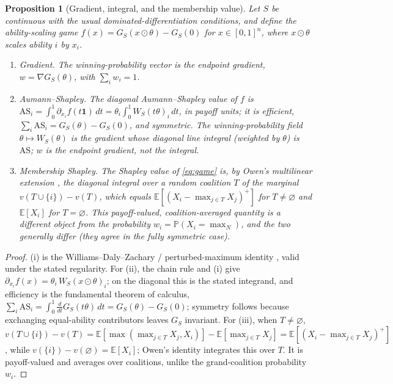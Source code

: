 \documentclass[11pt]{article}
\newcommand{\E}{\mathbb{E}}
\newcommand{\Prob}{\mathbb{P}}
\newtheorem{proposition}{Proposition}
\begin{document}
\begin{proposition}[Gradient, integral, and the membership value]
\label{prop:bridge}
Let $S$ be continuous with the usual dominated-differentiation conditions, and define
the ability-scaling game $f(x) = G_S(x\odot\theta) - G_S(0)$ for $x\in[0,1]^n$, where
$x\odot\theta$ scales ability $i$ by $x_i$.
\begin{enumerate}
\item[\textup{(i)}] \emph{Gradient.} The winning-probability vector is the endpoint
  gradient, $w = \nabla G_S(\theta)$, with $\sum_i w_i = 1$.
\item[\textup{(ii)}] \emph{Aumann--Shapley.} The diagonal Aumann--Shapley value of
  $f$ \parencite{aumannshapley1974} is
  $\mathrm{AS}_i = \int_0^1 \partial_{x_i} f(t\mathbf 1)\,dt
   = \theta_i \int_0^1 W_S(t\theta)_i\,dt$, in payoff units; it is efficient,
  $\sum_i \mathrm{AS}_i = G_S(\theta) - G_S(0)$, and symmetric. The
  winning-probability field $\theta\mapsto W_S(\theta)$ is the \emph{gradient} whose
  diagonal line integral (weighted by $\theta$) is $\mathrm{AS}$; $w$ is the endpoint
  gradient, not the integral.
\item[\textup{(iii)}] \emph{Membership Shapley.} The Shapley value of \eqref{eq:game}
  is, by Owen's multilinear extension \parencite{owen1972}, the diagonal integral
  over a random coalition $T$ of the marginal $v(T\cup\{i\}) - v(T)$, which equals
  $\E[(X_i - \max_{j\in T} X_j)^+]$ for $T\neq\varnothing$ and $\E[X_i]$ for
  $T = \varnothing$. This payoff-valued, coalition-averaged quantity is a different
  object from the probability $w_i = \Prob(X_i = \max_N)$, and the two generally
  differ (they agree in the fully symmetric case).
\end{enumerate}
\end{proposition}
\begin{proof}
(i) is the Williams--Daly--Zachary / perturbed-maximum identity
\parencite{williams1977, berthet2020}, valid under the stated regularity. For (ii),
the chain rule and (i) give $\partial_{x_i} f(x) = \theta_i\, W_S(x\odot\theta)_i$;
on the diagonal this is the stated integrand, and efficiency is the fundamental
theorem of calculus,
$\sum_i \mathrm{AS}_i = \int_0^1 \tfrac{d}{dt} G_S(t\theta)\,dt = G_S(\theta)-G_S(0)$;
symmetry follows because exchanging equal-ability contributors leaves $G_S$
invariant. For (iii), when $T\neq\varnothing$,
$v(T\cup\{i\}) - v(T) = \E[\max(\max_{j\in T} X_j, X_i)] - \E[\max_{j\in T} X_j]
= \E[(X_i - \max_{j\in T} X_j)^+]$, while $v(\{i\}) - v(\varnothing) = \E[X_i]$;
Owen's identity integrates this over $T$. It is payoff-valued and averages over
coalitions, unlike the grand-coalition probability $w_i$.
\end{proof}
\end{document}
